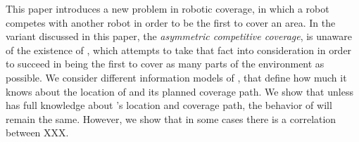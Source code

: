 This paper introduces a new problem in robotic coverage, in which a robot \rob competes with another robot \opp in order to be the first to cover an area. In the variant discussed in this paper, the {\em asymmetric competitive coverage}, \opp is unaware of the existence of \rob, which attempts to take that fact into consideration in order to succeed in being  the first to cover as many parts of the environment as possible. We consider different information models of \rob, that define how much it knows about the location of \opp and its planned coverage path. We show that unless \rob has full knowledge about \opp's location and coverage path, the behavior of \rob will remain the same. However, we show that in some cases there is a correlation between XXX.